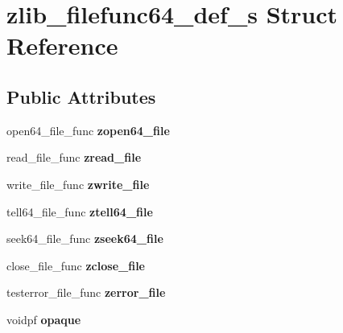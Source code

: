 \hypertarget{structzlib__filefunc64__def__s}{}\section{zlib\+\_\+filefunc64\+\_\+def\+\_\+s Struct Reference}
\label{structzlib__filefunc64__def__s}
\subsection*{Public Attributes}
\begin{DoxyCompactItemize}
\item 
\mbox{\label{structzlib__filefunc64__def__s_a53df1c67f9b44a61e607b9cfb9c409c0}} 
open64\+\_\+file\+\_\+func {\bfseries zopen64\+\_\+file}
\item 
\mbox{\label{structzlib__filefunc64__def__s_a5fd1cd36c741000649328d0db54523c5}} 
read\+\_\+file\+\_\+func {\bfseries zread\+\_\+file}
\item 
\mbox{\label{structzlib__filefunc64__def__s_a04f5366c9e7e48343357bb88b46998f9}} 
write\+\_\+file\+\_\+func {\bfseries zwrite\+\_\+file}
\item 
\mbox{\label{structzlib__filefunc64__def__s_a88b8bd0d697c49e384915fcab765b5b3}} 
tell64\+\_\+file\+\_\+func {\bfseries ztell64\+\_\+file}
\item 
\mbox{\label{structzlib__filefunc64__def__s_ab03b3242d363b748ea6e60b7b9e5e6d1}} 
seek64\+\_\+file\+\_\+func {\bfseries zseek64\+\_\+file}
\item 
\mbox{\label{structzlib__filefunc64__def__s_aaf7d9825e2afc16c93cec9956c4f1a10}} 
close\+\_\+file\+\_\+func {\bfseries zclose\+\_\+file}
\item 
\mbox{\label{structzlib__filefunc64__def__s_abdac5e81672673ef1f4242d6fdc49d2d}} 
testerror\+\_\+file\+\_\+func {\bfseries zerror\+\_\+file}
\item 
\mbox{\label{structzlib__filefunc64__def__s_a5f6d2267b03488a9edc3fdd9a2da0c2f}} 
voidpf {\bfseries opaque}
\end{DoxyCompactItemize}


